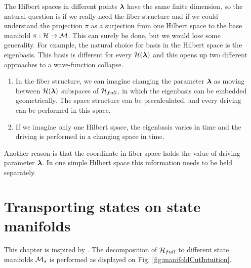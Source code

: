 The Hilbert spaces in different points ${\bm\lambda}$ have the same finite dimension, so the natural question is if we really need the fiber structure and if we could understand the projection $\pi$ as a surjection from one Hilbert space to the base manifold $\pi: \mathcal{H}\rightarrow \mathcal{M}$. This can surely be done, but we would lose some generality. For example, the natural choice for basis in the Hilbert space is the eigenbasis. This basis is different for every $\mathcal{H}({\bm\lambda})$ and this opens up two different approaches to a wave-function collapse.
\begin{enumerate}
    \item In the fiber structure, we can imagine changing the parameter ${\bm\lambda}$ as moving between $\mathcal{H}({\bm\lambda})$ subspaces of $\mathcal{H}_{full}$, in which the eigenbasis can be embedded geometrically. The space structure can be precalculated, and every driving can be performed in this space.
    \item If we imagine only one Hilbert space, the eigenbasis varies in time and the driving is performed in a changing space in time.
\end{enumerate}

Another reason is that the coordinate in fiber space holds the value of driving parameter ${\bm\lambda}$. In one simple Hilbert space this information needs to be held separately.







\section{Transporting states on state manifolds}
This chapter is inspired by \citet{berry1984}. The decomposition of $\mathcal{H}_{full}$ to different state manifolds $\mathcal{M}_s$ is performed as displayed on Fig. \ref{fig:manifoldCutIntuition}.

